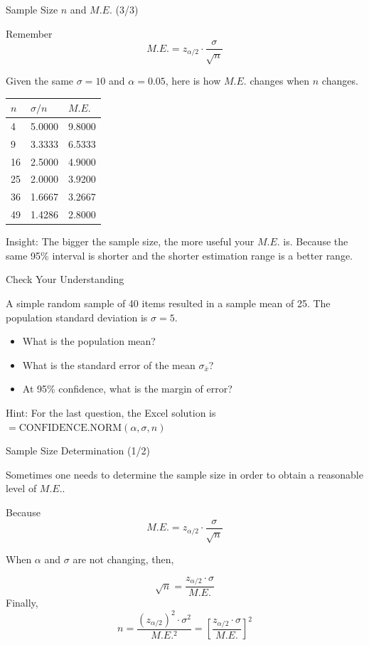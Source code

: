 \documentclass{beamer}
\begin{document}
\begin{frame}{Sample Size $n$ and $M.E.$ (3/3)}

Remember 
$$ M.E. = z_{\alpha/2} \cdot \frac{\sigma}{\sqrt{n}} $$

Given the same $\sigma = 10$ and $\alpha = 0.05$, here is how $M.E.$ changes when $n$ changes.

\begin{center}
\begin{tabular}{l|l|l}
\hline
$n$ & $\sigma/n$ & $M.E.$ \\ \hline
4   & 5.0000     & 9.8000 \\ \hline
9   & 3.3333     & 6.5333 \\ \hline
16  & 2.5000     & 4.9000 \\ \hline
25  & 2.0000     & 3.9200 \\ \hline
36  & 1.6667     & 3.2667 \\ \hline
49  & 1.4286     & 2.8000 \\ \hline
\end{tabular}
\end{center}

Insight: The bigger the sample size, the more useful your $M.E.$ is. Because the same 95\% interval is shorter and the shorter estimation range is a better range. 


\end{frame}


\begin{frame}{Check Your Understanding}

A simple random sample of 40 items resulted in a sample mean of 25. The population standard deviation is $\sigma = 5$. 
\begin{itemize}
\item What is the population mean? 
\item What is the standard error of the mean $\sigma_{\bar{x}}$? 
\item At 95\% confidence, what is the margin of error? 
\end{itemize}

\vspace{0.3 cm}
Hint: For the last question, the Excel solution is $ =\text{CONFIDENCE.NORM}(\alpha, \sigma, n)$

\end{frame}





\begin{frame}{Sample Size Determination (1/2)}

Sometimes one needs to determine the sample size in order to obtain a reasonable level of $M.E.$.

Because 
$$ M.E. = z_{\alpha/2} \cdot \frac{\sigma}{\sqrt{n}} $$

When $\alpha$ and $\sigma$ are not changing, then, 

$$ \sqrt{n} = \frac{z_{\alpha/2}\cdot \sigma}{M.E.} $$
Finally, 
$$ n = \frac{(z_{\alpha/2})^2\cdot \sigma^2}{M.E.^2} = \left[ \frac{z_{\alpha/2}\cdot \sigma}{M.E.}   \right]^2  $$

\end{frame}
\end{document}
